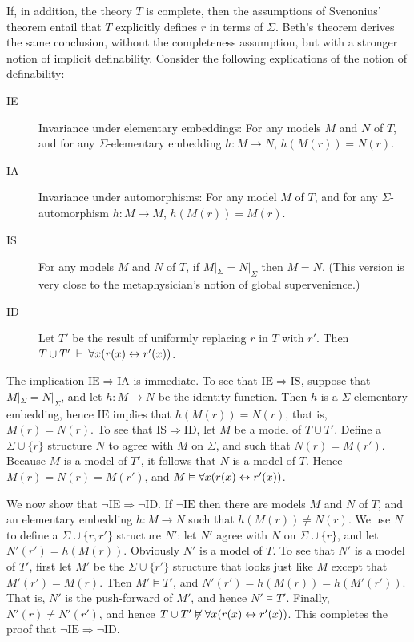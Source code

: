 If, in addition, the theory $T$ is complete, then the assumptions of
Svenonius' theorem entail that $T$ explicitly defines $r$ in terms of
$\Sigma$.  Beth's theorem derives the same conclusion, without the
completeness assumption, but with a stronger notion of implicit
definability.  Consider the following explications of the notion of
definability:
\begin{description}
  \item[IE] Invariance under elementary embeddings: For any models $M$
  and $N$ of $T$, and for any $\Sigma$-elementary embedding
  $h:M\to N$, $h(M(r))=N(r)$.
\item[IA] Invariance under automorphisms: For any model $M$ of
  $T$, and for any $\Sigma$-automorphism $h:M\to M$, $h(M(r))=M(r)$.
\item[IS] For any models $M$ and $N$ of $T$, if
  $M|_{\Sigma}=N|_{\Sigma}$ then $M=N$.  (This version is very close
  to the metaphysician's notion of global supervenience.)
\item[ID] Let $T'$ be the result of uniformly replacing $r$ in $T$
  with $r'$.  Then
  $T\cup T'\:\vdash\:\forall x(r(x)\leftrightarrow r'(x))$. \end{description}

The implication $\mathrm{IE}\Rightarrow\mathrm{IA}$ is immediate.  To
see that $\mathrm{IE}\Rightarrow\mathrm{IS}$, suppose that
$M|_{\Sigma}=N|_\Sigma$, and let $h:M\to N$ be the identity function.
Then $h$ is a $\Sigma$-elementary embedding, hence $\mathrm{IE}$
implies that $h(M(r))=N(r)$, that is, $M(r)=N(r)$.  To see that
$\mathrm{IS}\Rightarrow\mathrm{ID}$, let $M$ be a model of $T\cup T'$.
Define a $\Sigma \cup \{r \}$ structure $N$ to agree with $M$ on
$\Sigma$, and such that $N(r)=M(r')$.  Because $M$ is a model of $T'$,
it follows that $N$ is a model of $T$.  Hence $M(r)=N(r)=M(r')$, and
$M\vDash \forall x(r(x)\leftrightarrow r'(x))$.

We now show that $\neg\mathrm{IE}\Rightarrow\neg\mathrm{ID}$.  If
$\neg\mathrm{IE}$ then there are models $M$ and $N$ of $T$, and an
elementary embedding $h:M\to N$ such that $h(M(r))\neq N(r)$.  We use
$N$ to define a $\Sigma\cup \{ r,r'\}$ structure $N'$: let $N'$ agree
with $N$ on $\Sigma \cup \{r \}$, and let $N'(r')=h(M(r))$.  Obviously
$N'$ is a model of $T$.  To see that $N'$ is a model of $T'$, first
let $M'$ be the $\Sigma\cup \{ r'\}$ structure that looks just like
$M$ except that $M'(r')=M(r)$.  Then $M'\vDash T'$, and
$N'(r')=h(M(r))=h(M'(r'))$.  That is, $N'$ is the push-forward of
$M'$, and hence $N'\vDash T'$.  Finally, $N'(r)\neq N'(r')$, and hence
$T\cup T'\not\vDash \forall x(r(x)\leftrightarrow r'(x))$.  This completes the
proof that $\neg\mathrm{IE}\Rightarrow\neg\mathrm{ID}$.

